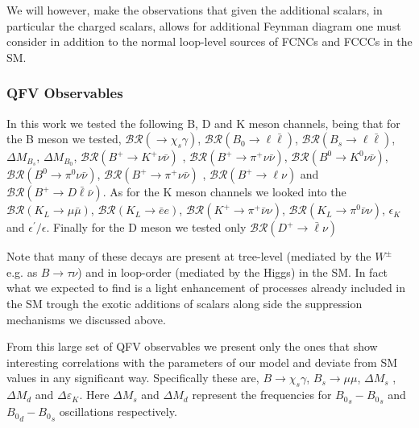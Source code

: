 \documentclass[10pt]{book}
\renewcommand{\(}{\left(}
\renewcommand{\)}{\right)}
\renewcommand{\[}{\left[}
\renewcommand{\]}{\right]}
\begin{document}
We will however, make the observations that given the additional scalars, in particular the charged scalars, allows for additional Feynman diagram one must consider in addition to the normal loop-level sources of FCNCs and FCCCs in the SM. 
% 
%

\subsubsection{QFV Observables}

In this work we tested the following B, D and K meson channels, being that for the B meson we tested, 
$\mathcal{BR} \left( \rightarrow \chi_s \gamma \right)$, 
$\mathcal{BR} \left( B_0 \rightarrow \ell \bar{\ell} \right)$, 
$\mathcal{BR} \left( B_s \rightarrow \ell \bar{\ell} \right)$, 
$\Delta M_{B_s}$, 
$\Delta M_{B_0}$, 
$\mathcal{BR} \left( B^+ \rightarrow K^+\nu\bar{\nu} \right)$ , 
$\mathcal{BR} \left( B^+ \rightarrow \pi^+\nu\bar{\nu} \right)$, 
$\mathcal{BR} \left( B^0 \rightarrow K^0\nu\bar{\nu} \right)$,  
$\mathcal{BR} \left( B^0 \rightarrow \pi^0 \nu\bar{\nu} \right)$, 
$\mathcal{BR} \left( B^+ \rightarrow \pi^+\nu\bar{\nu} \right)$ , 
$\mathcal{BR} \left( B^+ \rightarrow \ell \nu \right)$ and
$\mathcal{BR} \left( B^+ \rightarrow D \bar{\ell} \bar{\nu} \right)$. 
%
As for the K meson channels we looked into the $\mathcal{BR} \left( K_L \rightarrow \mu \bar{\mu} \right)$,  $\mathcal{BR} \left( K_L \rightarrow \bar{e} e \right)$,  $\mathcal{BR} \left( K^+ \rightarrow \pi^+ \bar{\nu} \nu \right)$, $\mathcal{BR} \left( K_L \rightarrow \pi^0 \bar{\nu} \nu \right)$, $\epsilon_K$ and $\epsilon^\prime/\epsilon$. 
%
Finally for the D meson we tested only $\mathcal{BR} ( D^+ \rightarrow \bar{\ell} \nu ) $

Note that many of these decays are present at tree-level (mediated by the $W^\pm$ e.g. as $B \rightarrow \tau \nu$) and in loop-order (mediated by the Higgs) in the SM. 
%
In fact what we expected to find is a light enhancement of processes already included in the SM trough the exotic additions of scalars along side the suppression mechanisms we discussed above. 

From this large set of QFV observables we present only the ones that show interesting correlations with the parameters of our model and deviate from SM values in any significant way.
%
Specifically these are, $B \rightarrow \chi_s \gamma$, $B_s \rightarrow \mu \mu$, $\Delta M_s$ , $\Delta M_d$ and $\Delta \varepsilon_K$. 
%
Here $\Delta M_s$ and $\Delta M_d$ represent the frequencies for ${B_0}_s - {B_0}_s$ and ${B_0}_d - {B_0}_s$ oscillations respectively. 
 
\end{document}
